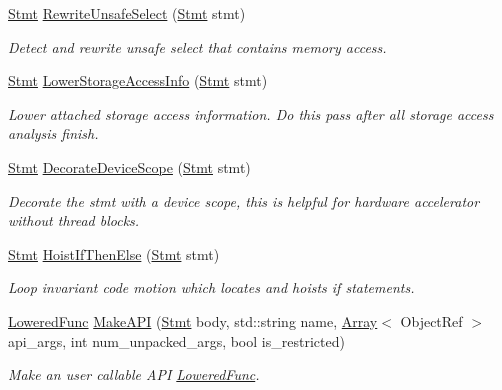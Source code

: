 \begin{DoxyCompactItemize}
\hyperlink{classtvm_1_1tir_1_1Stmt}{Stmt} \hyperlink{namespacetvm_1_1tir_a2c3a142f48991df5a96ee1791685ca64}{Rewrite\+Unsafe\+Select} (\hyperlink{classtvm_1_1tir_1_1Stmt}{Stmt} stmt)
\begin{DoxyCompactList}\small\item\em Detect and rewrite unsafe select that contains memory access. \end{DoxyCompactList}\item 
\hyperlink{classtvm_1_1tir_1_1Stmt}{Stmt} \hyperlink{namespacetvm_1_1tir_a3b6c7e53cce5184e897b0bd24adb06b6}{Lower\+Storage\+Access\+Info} (\hyperlink{classtvm_1_1tir_1_1Stmt}{Stmt} stmt)
\begin{DoxyCompactList}\small\item\em Lower attached storage access information. Do this pass after all storage access analysis finish. \end{DoxyCompactList}\item 
\hyperlink{classtvm_1_1tir_1_1Stmt}{Stmt} \hyperlink{namespacetvm_1_1tir_a1f89ddc934004f9e58b2e6ac3a260e3d}{Decorate\+Device\+Scope} (\hyperlink{classtvm_1_1tir_1_1Stmt}{Stmt} stmt)
\begin{DoxyCompactList}\small\item\em Decorate the stmt with a device scope, this is helpful for hardware accelerator without thread blocks. \end{DoxyCompactList}\item 
\hyperlink{classtvm_1_1tir_1_1Stmt}{Stmt} \hyperlink{namespacetvm_1_1tir_a803eaac5980c445a9ff8e38fb2c595fa}{Hoist\+If\+Then\+Else} (\hyperlink{classtvm_1_1tir_1_1Stmt}{Stmt} stmt)
\begin{DoxyCompactList}\small\item\em Loop invariant code motion which locates and hoists if statements. \end{DoxyCompactList}\item 
\hyperlink{classtvm_1_1tir_1_1LoweredFunc}{Lowered\+Func} \hyperlink{namespacetvm_1_1tir_ab2d44994c14f11c500586a007c782c84}{Make\+A\+PI} (\hyperlink{classtvm_1_1tir_1_1Stmt}{Stmt} body, std\+::string name, \hyperlink{classtvm_1_1Array}{Array}$<$ Object\+Ref $>$ api\+\_\+args, int num\+\_\+unpacked\+\_\+args, bool is\+\_\+restricted)
\begin{DoxyCompactList}\small\item\em Make an user callable A\+PI \hyperlink{classtvm_1_1tir_1_1LoweredFunc}{Lowered\+Func}. \end{DoxyCompactList}\item 

\end{DoxyCompactItemize}

